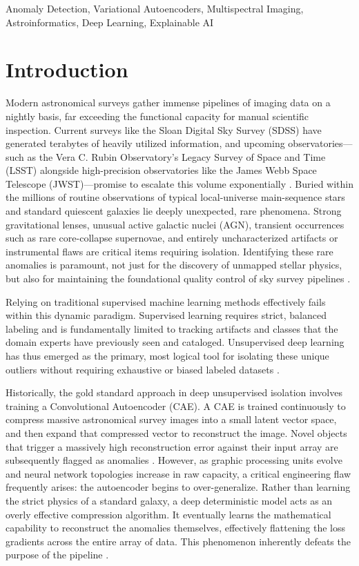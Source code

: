 \documentclass[conference]{IEEEtran}
\begin{document}
\begin{IEEEkeywords}
Anomaly Detection, Variational Autoencoders, Multispectral Imaging, Astroinformatics, Deep Learning, Explainable AI
\end{IEEEkeywords}

\section{Introduction}
Modern astronomical surveys gather immense pipelines of imaging data on a nightly basis, far exceeding the functional capacity for manual scientific inspection. Current surveys like the Sloan Digital Sky Survey (SDSS) have generated terabytes of heavily utilized information, and upcoming observatories—such as the Vera C. Rubin Observatory's Legacy Survey of Space and Time (LSST) alongside high-precision observatories like the James Webb Space Telescope (JWST)—promise to escalate this volume exponentially \cite{Perez2025}. Buried within the millions of routine observations of typical local-universe main-sequence stars and standard quiescent galaxies lie deeply unexpected, rare phenomena. Strong gravitational lenses, unusual active galactic nuclei (AGN), transient occurrences such as rare core-collapse supernovae, and entirely uncharacterized artifacts or instrumental flaws are critical items requiring isolation. Identifying these rare anomalies is paramount, not just for the discovery of unmapped stellar physics, but also for maintaining the foundational quality control of sky survey pipelines \cite{Giles2020}. 

Relying on traditional supervised machine learning methods effectively fails within this dynamic paradigm. Supervised learning requires strict, balanced labeling and is fundamentally limited to tracking artifacts and classes that the domain experts have previously seen and cataloged. Unsupervised deep learning has thus emerged as the primary, most logical tool for isolating these unique outliers without requiring exhaustive or biased labeled datasets \cite{Walmsley2022}. 

Historically, the gold standard approach in deep unsupervised isolation involves training a Convolutional Autoencoder (CAE). A CAE is trained continuously to compress massive astronomical survey images into a small latent vector space, and then expand that compressed vector to reconstruct the image. Novel objects that trigger a massively high reconstruction error against their input array are subsequently flagged as anomalies \cite{Zanella2021}. However, as graphic processing units evolve and neural network topologies increase in raw capacity, a critical engineering flaw frequently arises: the autoencoder begins to over-generalize. Rather than learning the strict physics of a standard galaxy, a deep deterministic model acts as an overly effective compression algorithm. It eventually learns the mathematical capability to reconstruct the anomalies themselves, effectively flattening the loss gradients across the entire array of data. This phenomenon inherently defeats the purpose of the pipeline \cite{Rodriguez2023}.
\end{document}
